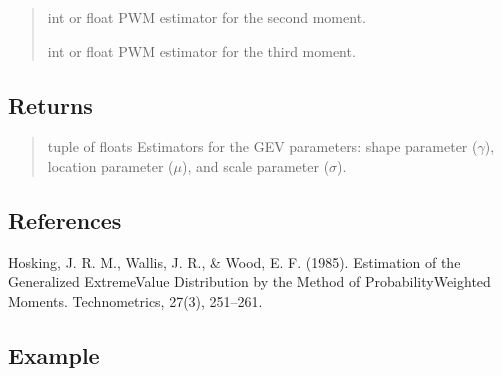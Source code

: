 \documentclass[a4paper,11pt,openany,english]{sphinxmanual}
\begin{document}
\begin{fulllineitems}
\begin{quote}
\begin{description}
\sphinxAtStartPar
int or float
PWM estimator for the second moment.

\sphinxAtStartPar
int or float
PWM estimator for the third moment.

\end{description}\end{quote}


\subsection{Returns}
\label{\detokenize{api_misc:id28}}\begin{quote}\begin{description}
\sphinxAtStartPar
tuple of floats
Estimators for the GEV parameters: shape parameter (\(\gamma\)), location parameter (\(\mu\)), 
and scale parameter (\(\sigma\)).

\end{description}\end{quote}


\subsection{References}
\label{\detokenize{api_misc:id29}}
\sphinxAtStartPar
Hosking, J. R. M., Wallis, J. R., \& Wood, E. F. (1985). Estimation of the Generalized Extreme\sphinxhyphen{}Value Distribution 
by the Method of Probability\sphinxhyphen{}Weighted Moments. Technometrics, 27(3), 251–261. 


\subsection{Example}
\label{\detokenize{api_misc:id30}}
\begin{sphinxVerbatim}[commandchars=\\\{\}]
  
  
  
  
\end{sphinxVerbatim}

\end{fulllineitems}
\end{document}

